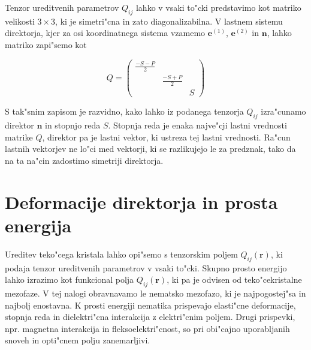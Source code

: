 \documentclass[12pt,twoside,openright,final]{report}
\renewcommand{\vec}{\mathbf}
\begin{document}
Tenzor ureditvenih parametrov $Q_{ij}$ lahko v vsaki to"cki predstavimo kot matriko velikosti $3\times 3$, ki je simetri"cna in zato diagonalizabilna. 
V lastnem sistemu direktorja, kjer za osi koordinatnega sistema vzamemo $\vec e^{(1)}$, $\vec e^{(2)}$ in $\vec n$, lahko matriko zapi"semo kot

\begin{equation}
 Q = \begin{pmatrix}
   \frac{-S-P}{2} & & \\
  & \frac{-S+P}{2} & \\
    &   & S
 \end{pmatrix}
\end{equation}

S tak"snim zapisom je razvidno, kako lahko iz podanega tenzorja $Q_{ij}$ izra"cunamo direktor $\vec n$ in stopnjo reda $S$. 
Stopnja reda je enaka najve"cji lastni vrednosti matrike $Q$, direktor pa je lastni vektor, ki ustreza tej lastni vrednosti. 
Ra"cun lastnih vektorjev ne lo"ci med vektorji, ki se razlikujejo le za predznak, tako da na ta na"cin zadostimo simetriji direktorja. 

\section{Deformacije direktorja in prosta energija}

Ureditev teko"cega kristala lahko opi"semo s tenzorskim poljem $Q_{ij}(\vec r)$, ki podaja tenzor ureditvenih parametrov v vsaki to"cki. 
Skupno prosto energijo lahko izrazimo kot funkcional polja $Q_{ij}(\vec r)$, ki pa je odvisen od teko"cekristalne mezofaze. 
V tej nalogi obravnavamo le nematsko mezofazo, ki je najpogostej"sa in najbolj enostavna. 
K prosti energiji nematika prispevajo elasti"cne deformacije, stopnja reda in dielektri"cna interakcija z elektri"cnim poljem. 
Drugi prispevki, npr. magnetna interakcija in fleksoelektri"cnost, so pri obi"cajno uporabljanih snoveh in opti"cnem polju zanemarljivi.
\end{document}
